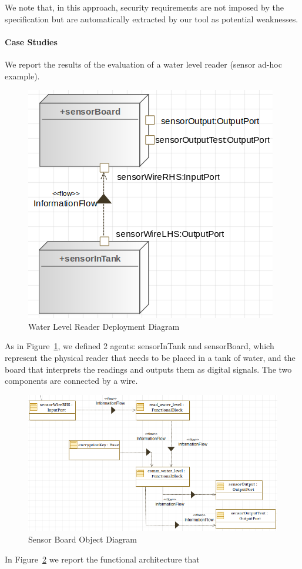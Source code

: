 \documentclass[conference]{IEEEtran}
\begin{document}
We note that, in this approach, security requirements are not imposed by the
specification but are automatically extracted by our tool as potential weaknesses.

\paragraph{Case Studies}
We report the results of the evaluation of a water level reader (sensor ad-hoc example). 
\begin{figure}
	\centering
	\includegraphics[width=.7\columnwidth]{eng_cs1.png}
	\caption{Water Level Reader Deployment Diagram}
	\label{fig:eng_cs1}
\end{figure}
As in Figure~\ref{fig:eng_cs1}, we defined 2 agents: sensorInTank and sensorBoard,
which represent the physical reader that needs to be placed in a tank of water, and 
the board that interprets the readings and outputs them as digital signals.
The two components are connected by a wire.
\begin{figure}
	\centering
	\includegraphics[width=.7\textwidth]{internal_cs1.png}
	\caption{Sensor Board Object Diagram}
	\label{fig:int_cs1}
\end{figure}
In Figure~\ref{fig:int_cs1} we report the functional architecture that
\end{document}
